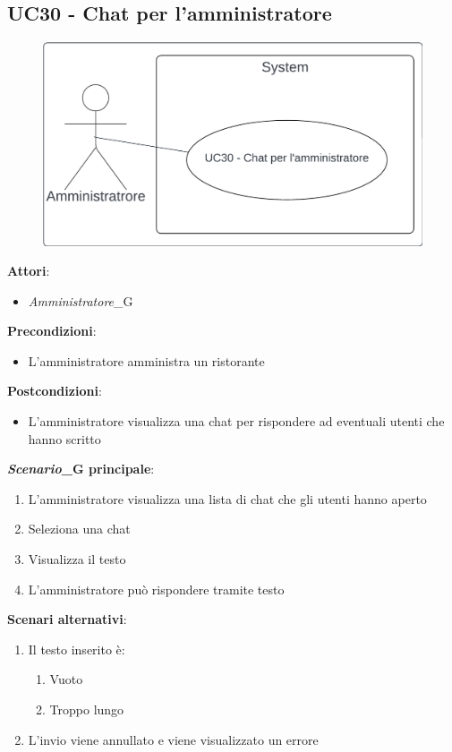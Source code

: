\subsection{UC30 - Chat per l'amministratore}\label{usecase:30}
\begin{figure}[H]
    \centering
    \includegraphics[width=0.75\linewidth]{ucd/UCD30.png}
\end{figure}
\textbf{Attori}:
\begin{itemize}
    \item \textit{Amministratore}_G
\end{itemize}
\textbf{Precondizioni}:
\begin{itemize}
    \item L'amministratore amministra un ristorante
\end{itemize}
\textbf{Postcondizioni}:
\begin{itemize}
    \item L'amministratore visualizza una chat per rispondere ad eventuali utenti che hanno scritto
\end{itemize}
\textbf{\textit{Scenario}_G principale}:
\begin{enumerate}
    \item L'amministratore visualizza una lista di chat che gli utenti hanno aperto
    \item Seleziona una chat
    \item Visualizza il testo
    \item L'amministratore può rispondere tramite testo
\end{enumerate}
\textbf{Scenari alternativi}:
\begin{enumerate}
    \item Il testo inserito è:
    \begin{enumerate}
        \item Vuoto
        \item Troppo lungo
    \end{enumerate}
    \item L'invio viene annullato e viene visualizzato un errore
\end{enumerate}